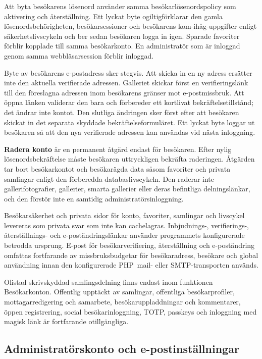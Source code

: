 \documentclass[11pt,a4paper]{article}
\newcommand{\ui}[1]{\textbf{#1}}
\begin{document}
Att byta besökarens lösenord använder samma besökarlösenordspolicy som
aktivering och återställning. Ett lyckat byte ogiltigförklarar den gamla
lösenordsbehörigheten, besökarsessioner och besökarens kom-ihåg-uppgifter enligt
säkerhetslivscykeln och ber sedan besökaren logga in igen. Sparade favoriter
förblir kopplade till samma besökarkonto. En administratör som är inloggad genom
samma webbläsarsession förblir inloggad.

Byte av besökarens e-postadress sker stegvis. Att skicka in en ny adress
ersätter inte den aktuella verifierade adressen. Galleriet skickar först en
verifieringslänk till den föreslagna adressen inom besökarens gränser mot
e-postmissbruk. Att öppna länken validerar den bara och förbereder ett kortlivat
bekräftelsetillstånd; det ändrar inte kontot. Den slutliga ändringen sker först
efter att besökaren skickat in det separata skyddade bekräftelseformuläret. Ett
lyckat byte loggar ut besökaren så att den nya verifierade adressen kan användas
vid nästa inloggning.

\ui{Radera konto} är en permanent åtgärd endast för besökaren. Efter nylig
lösenordsbekräftelse måste besökaren uttryckligen bekräfta raderingen. Åtgärden
tar bort besökarkontot och besökarägda data såsom favoriter och privata
samlingar enligt den förberedda databaslivscykeln. Den raderar inte
gallerifotografier, gallerier, smarta gallerier eller deras befintliga
delningslänkar, och den förstör inte en samtidig administratörsinloggning.

Besökarsäkerhet och privata sidor för konto, favoriter, samlingar och livscykel
levereras som privata svar som inte kan cachelagras. Inbjudnings-,
verifierings-, återställnings- och e-poständringslänkar använder programmets
konfigurerade betrodda ursprung. E-post för besökarverifiering, återställning
och e-poständring omfattas fortfarande av missbruksbudgetar för besökaradress,
besökare och global användning innan den konfigurerade PHP~mail- eller
SMTP-transporten används.

Olistad skrivskyddad samlingsdelning finns endast inom funktionen Besökarkonton.
Offentlig upptäckt av samlingar, offentliga besökarprofiler, mottagarredigering
och samarbete, besökaruppladdningar och kommentarer, öppen registrering, social
besökarinloggning, TOTP, passkeys och inloggning med magisk länk är fortfarande
otillgängliga.

\subsection{Administratörskonto och e-postinställningar}
\end{document}
